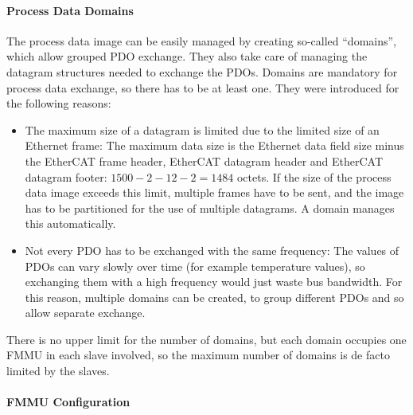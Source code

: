 \documentclass[a4paper,12pt,BCOR=6mm,bibtotoc,idxtotoc]{scrbook}
\begin{document}
\paragraph{Process Data Domains}

The process data image can be easily managed by creating so-called
``domains'', which allow grouped PDO exchange. They also take care of managing
the datagram structures needed to exchange the PDOs. Domains are mandatory for
process data exchange, so there has to be at least one. They were introduced
for the following reasons:

\begin{itemize}

\item The maximum size of a datagram is limited due to the limited size of an
Ethernet frame: The maximum data size is the Ethernet data field size minus
the EtherCAT frame header, EtherCAT datagram header and EtherCAT datagram
footer: $1500 - 2 - 12 - 2 = 1484$ octets. If the size of the process data
image exceeds this limit, multiple frames have to be sent, and the image has
to be partitioned for the use of multiple datagrams. A domain manages this
automatically.

\item Not every PDO has to be exchanged with the same frequency: The values of
PDOs can vary slowly over time (for example temperature values), so exchanging
them with a high frequency would just waste bus bandwidth. For this reason,
multiple domains can be created, to group different PDOs and so allow separate
exchange.

\end{itemize}

There is no upper limit for the number of domains, but each domain occupies
one FMMU in each slave involved, so the maximum number of domains is de facto
limited by the slaves.

\paragraph{FMMU Configuration}
\end{document}
